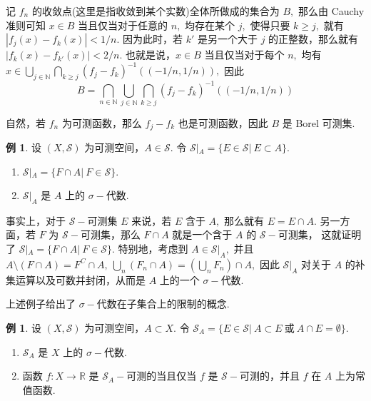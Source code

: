 \documentclass[12pt, a4paper, oneside]{book}
\numberwithin{figure}{section}
\theoremstyle{definition}
\newtheorem{example}[theorem]{例}
\begin{document}
记 $f_n$ 的收敛点(这里是指收敛到某个实数)全体所做成的集合为 $B,$ 那么由 Cauchy 准则可知 $x\in B$ 当且仅当对于任意的 $n,$ 均存在某个 $j,$ 使得只要 $k\geq j,$ 就有 $|f_j(x)-f_k(x)|<1/n.$ 因为此时，若 $k'$ 是另一个大于 $j$ 的正整数，那么就有 $|f_k(x)-f_{k'}(x)|<2/n.$
也就是说，$x\in B$ 当且仅当对于每个 $n,$ 均有 $x\in \bigcup_{j\in\mathbb N}\bigcap_{k\geq j} (f_j-f_k)^{-1}((-1/n,1/n)),$ 因此
\begin{equation}
    B=\bigcap_{n\in\mathbb N}\bigcup_{j\in\mathbb N}\bigcap_{k\geq j} (f_j-f_k)^{-1}((-1/n,1/n))
\end{equation}

自然，若 $f_n$ 为可测函数，那么 $f_j-f_k$ 也是可测函数，因此 $B$ 是 Borel 可测集. 


\begin{example}\label{ex:sigma_algebra_restriction}
    设 $(X,\mathcal S)$ 为可测空间，$A\in\mathcal S.$ 令 $\mathcal S|_A=\{E\in\mathcal S|\ E\subset A\}.$
    \begin{enumerate}[label=\alph*)]
        \item $\mathcal S|_A=\{F\cap A|\ F\in\mathcal S\}.$
        \item $\mathcal S|_A$ 是 $A$ 上的 $\sigma-$代数.
    \end{enumerate}
\end{example}
事实上，对于 $\mathcal S-$可测集 $E$ 来说，若 $E$ 含于 $A,$ 那么就有 $E=E\cap A.$ 另一方面，若 $F$ 为 $\mathcal S-$可测集，那么 $F\cap A$ 就是一个含于 $A$ 的 $\mathcal S-$可测集，
这就证明了 $\mathcal S|_A=\{F\cap A|\ F\in\mathcal S\}.$ 特别地，考虑到 $A\in \mathcal S|_A,$ 并且 $A\setminus(F\cap A)=F^C\cap A,\ \bigcup_n(F_n\cap A)=(\bigcup_n F_n)\cap A,$ 因此 $\mathcal S|_A$ 对关于 $A$ 的补集运算以及可数并封闭，从而是 $A$ 上的一个 $\sigma-$代数.


上述例子给出了 $\sigma-$代数在子集合上的限制的概念.


\begin{example}\label{ex:sigma_algebra_frozen_restriction}
    设 $(X,\mathcal S)$ 为可测空间，$A\subset X.$ 令 $\mathcal S_A=\{E\in\mathcal S|\ A\subset E\ \text{或}\ A\cap E=\emptyset\}.$
    \begin{enumerate}[label=\alph*)]
        \item $\mathcal S_A$ 是 $X$ 上的 $\sigma-$代数.
        \item 函数 $f:X\to \mathbb R$ 是 $\mathcal S_A-$可测的当且仅当 $f$ 是 $\mathcal S-$可测的，并且 $f$ 在 $A$ 上为常值函数.
    \end{enumerate}
\end{example}
\end{document}
